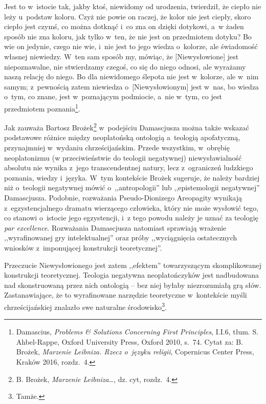 Jest to w~istocie tak, jakby ktoś, niewidomy od urodzenia, twierdził, że ciepło nie leży u~podstaw koloru. Czyż nie powie on raczej, że kolor nie jest ciepły, skoro ciepło jest czymś, co można dotknąć i~co zna on dzięki dotykowi, a~w żaden sposób nie zna koloru, jak tylko w~ten, że nie jest on przedmiotem dotyku? Bo wie on jedynie, czego nie wie, i~nie jest to jego wiedza o~kolorze, ale świadomość własnej niewiedzy. W~ten sam sposób my, mówiąc, że [Niewysłowione] jest niepoznawalne, nie stwierdzamy czegoś, co się do niego odnosi, ale wyrażamy naszą relację do niego. Bo dla niewidomego ślepota nie jest w~kolorze, ale w~nim samym; z~pewnością zatem niewiedza o~[Niewysłowionym] jest w~nas, bo wiedza o~tym, co znane, jest w~poznającym podmiocie, a~nie w~tym, co jest przedmiotem poznania\footnote{ Damascius, \textit{Problems \& Solutions Concerning First Principles}, I.I.6, tłum. S. Ahbel-Rappe, Oxford University Press, Oxford 2010, s.~74. Cytat za: B. Brożek, \textit{Marzenie Leibniza. Rzecz o~języku religii}, Copernicus Center Press, Kraków 2016, rozdz.~4.}.

Jak zauważa Bartosz Brożek\footnote{ B. Brożek, \textit{Marzenie Leibniza}…, dz. cyt, rozdz.~4.} w~podejściu Damascjusza można także wskazać podstawowe różnice między neoplatońską ontologią a~teologią apofatyczną, przynajmniej w~wydaniu chrześcijańskim. Przede wszystkim, w~obrębię neoplatonizmu (w przeciwieństwie do teologii negatywnej) niewysławialność absolutu nie wynika z~jego transcendentnej natury, lecz z~ograniczeń ludzkiego poznania, wiedzy i~języka. W~tym kontekście Brożek sugeruje, że należy bardziej niż o~teologii negatywnej mówić o~,,antropologii'' lub ,,epistemologii negatywnej'' Damascjusza. Podobnie, rozważania Pseudo-Dionizego Areopagity wynikają z~egzystencjalnego dramatu wierzącego człowieka, który nie może wysłowić tego, co stanowi o~istocie jego egzystencji, i~z tego powodu należy je uznać za teologię \textit{par excellence}. Rozważania Damascjusza natomiast sprawiają wrażenie ,,wyrafinowanej gry intelektualnej'' oraz próby ,,wyciągnięcia ostatecznych wniosków z~imponującej konstrukcji teoretycznej''.

Przeczucie Niewysłowionego jest zatem ,,efektem'' towarzyszącym skomplikowanej konstrukcji teoretycznej. Teologia negatywna neoplatończyków jest nadbudowana nad skonstruowaną przez nich ontologią -- bez niej byłaby niezrozumiałą grą słów. Zastanawiające, że to wyrafinowane narzędzie teoretyczne w~kontekście myśli chrześcijańskiej znalazło swe naturalne środowisko\footnote{ Tamże.}.

